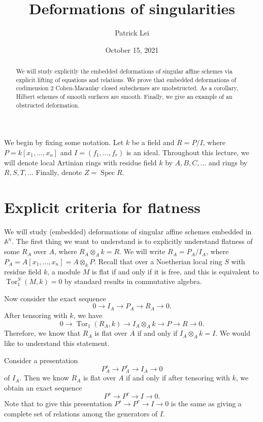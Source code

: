 \documentclass{amsart}
\title{Deformations of singularities}
\author{Patrick Lei}
\date{October 15, 2021}
\theoremstyle{definition}
\theoremstyle{remark}
\theoremstyle{plain}
\theoremstyle{definition}
\theoremstyle{remark}
\newcommand{\A}{\mathbb{A}}
\newcommand{\1}{\mathbf{1}}
\newcommand{\2}{\mathbf{2}}
\newcommand{\3}{\mathbf{3}}
\DeclareMathOperator{\Tor}{Tor}
\DeclareMathOperator{\Spec}{Spec}
\begin{document}
    
\maketitle

\begin{abstract}
    We will study explicitly the embedded deformations of singular affine schemes via explicit lifting of equations and relations. We prove that embedded deformations of codimension $2$ Cohen-Macaulay closed subschemes are unobstructed. As a corollary, Hilbert schemes of smooth surfaces are smooth. Finally, we give an example of an obstructed deformation.
\end{abstract}

We begin by fixing some notation.
Let $k$ be a field and $R = P/I$, where $P = k[x_1, \ldots, x_n]$ and $I = (f_1, \ldots, f_r)$ is an ideal. Throughout this lecture, we will denote local Artinian rings with residue field $k$ by $A,B,C,\ldots$ and rings by $R,S,T,\ldots$ Finally, denote $Z = \Spec R$.

\section{Explicit criteria for flatness}%
\label{sec:explicit_criteria_for_flatness}

We will study (embedded) deformations of singular affine schemes embedded in $\A^n$. The first thing we want to understand is to explicitly understand flatness of some $R_A$ over $A$, where $R_A \otimes_A k = R$. We will write $R_A = P_A / I_A$, where $P_A = A[x_1, \ldots, x_n] = A \otimes_k P$. Recall that over a Noetherian local ring $S$ with residue field $k$, a module $M$ is flat if and only if it is free, and this is equivalent to $\Tor_1^S(M, k) = 0$ by standard results in commutative algebra.

Now consider the exact sequence
\[ 0 \to I_A \to P_A \to R_A \to 0. \]
After tensoring with $k$, we have 
\[ 0 \to \Tor_1(R_A, k) \to I_A \otimes_A k \to P \to R \to 0. \]
Therefore, we know that $R_A$ is flat over $A$ if and only if $I_A \otimes_A k = I$. We would like to understand this statement.

Consider a presentation
\[ P^s_A \to P_A^r \to I_A \to 0 \]
of $I_A$. Then we know $R_A$ is flat over $A$ if and only if after tensoring with $k$, we obtain an exact sequence
\[ P^s \to P^r \to I \to 0. \]
Note that to give this presentation $P^s \to P^r \to I \to 0$ is the same as giving a complete set of relations among the generators of $I$.
\end{document}
